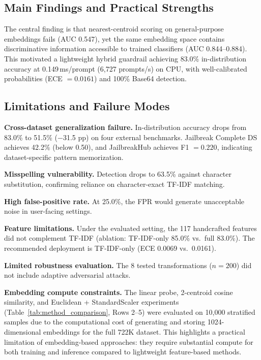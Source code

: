 \documentclass[12pt,a4paper]{article}
\begin{document}
\subsection{Main Findings and Practical Strengths}

The central finding is that nearest-centroid scoring on general-purpose embeddings fails (AUC 0.547), yet the same embedding space contains discriminative information accessible to trained classifiers (AUC 0.844--0.884). This motivated a lightweight hybrid guardrail achieving 83.0\% in-distribution accuracy at 0.149\,ms/prompt (6,727 prompts/s) on CPU, with well-calibrated probabilities (ECE $= 0.0161$) and 100\% Base64 detection.

\subsection{Limitations and Failure Modes}

\textbf{Cross-dataset generalization failure.} In-distribution accuracy drops from 83.0\% to 51.5\% ($-$31.5 pp) on four external benchmarks. Jailbreak Complete DS achieves 42.2\% (below 0.50), and JailbreakHub achieves F1 $= 0.220$, indicating dataset-specific pattern memorization.

\textbf{Misspelling vulnerability.} Detection drops to 63.5\% against character substitution, confirming reliance on character-exact TF-IDF matching.

\textbf{High false-positive rate.} At 25.0\%, the FPR would generate unacceptable noise in user-facing settings.

\textbf{Feature limitations.} Under the evaluated setting, the 117 handcrafted features did not complement TF-IDF (ablation: TF-IDF-only 85.0\% vs.\ full 83.0\%). The recommended deployment is TF-IDF-only (ECE 0.0069 vs.\ 0.0161).

\textbf{Limited robustness evaluation.} The 8 tested transformations ($n=200$) did not include adaptive adversarial attacks.

\textbf{Embedding compute constraints.} The linear probe, 2-centroid cosine similarity, and Euclidean + StandardScaler experiments (Table~\ref{tab:method_comparison}, Rows 2--5) were evaluated on 10,000 stratified samples due to the computational cost of generating and storing 1024-dimensional embeddings for the full 722K dataset. This highlights a practical limitation of embedding-based approaches: they require substantial compute for both training and inference compared to lightweight feature-based methods.
\end{document}
